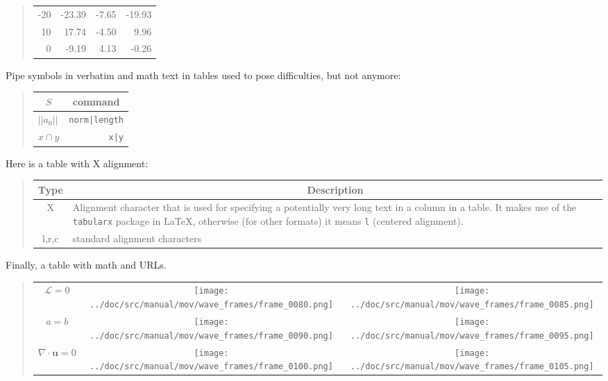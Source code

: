 \documentclass[%
oneside,                 %
final,                   %
10pt]{article}
\theoremstyle{definition}
\begin{document}
\begin{enumerate}
\begin{quote}
\begin{tabular}{rrrr}
-20   & -23.39     & -7.65              & -19.93         \\
10    & 17.74      & -4.50              & 9.96           \\
0     & -9.19      & 4.13               & -0.26          \\
\hline
\end{tabular}
\end{quote}
\noindent
Pipe symbols in verbatim and math text in tables used to pose difficulties,
but not
anymore:
\begin{quote}
\begin{tabular}{lr}
\hline
\multicolumn{1}{c}{ $S$ } & \multicolumn{1}{c}{ command } \\
\hline
$ ||a_0|| $ & \texttt{norm|length} \\
$x\cap y$   & \texttt{x|y}         \\
\hline
\end{tabular}
\end{quote}
\noindent
Here is a table with X alignment:
\begin{quote}
\begin{tabularx}{\linewidth}{cX}
\hline
\multicolumn{1}{c}{ Type } & \multicolumn{1}{c}{ Description } \\
\hline
X     & Alignment character that is used for specifying a potentially very long text in a column in a table. It makes use of the \texttt{tabularx} package in {\LaTeX}, otherwise (for other formats) it means \texttt{l} (centered alignment). \\
l,r,c & standard alignment characters                                                                                                                                                                                                       \\
\hline
\end{tabularx}
\end{quote}
\noindent
Finally, a table with math
and URLs.
\begin{quote}
\begin{tabular}{ccc}
\hline
 \\
\hline
$\mathcal{L}=0$         & \texttt{[image: ../doc/src/manual/mov/wave\_frames/frame\_0080.png]} & \texttt{[image: ../doc/src/manual/mov/wave\_frames/frame\_0085.png]} \\
$a=b$                   & \texttt{[image: ../doc/src/manual/mov/wave\_frames/frame\_0090.png]} & \texttt{[image: ../doc/src/manual/mov/wave\_frames/frame\_0095.png]} \\
$\nabla\cdot\bm{u} =0 $ & \texttt{[image: ../doc/src/manual/mov/wave\_frames/frame\_0100.png]} & \texttt{[image: ../doc/src/manual/mov/wave\_frames/frame\_0105.png]} \\
\hline
\end{tabular}
\end{quote}
\noindent

\end{enumerate}
\end{document}
